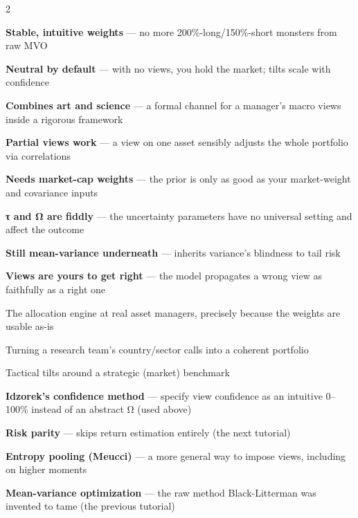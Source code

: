 \documentclass{pyportfolios-note}
\begin{document}
\begin{multicols}{2}
\begin{notebullets}
\item \textbf{Stable, intuitive weights} — no more 200\%-long/150\%-short
      monsters from raw MVO
\item \textbf{Neutral by default} — with no views, you hold the market; tilts
      scale with confidence
\item \textbf{Combines art and science} — a formal channel for a manager's macro
      views inside a rigorous framework
\item \textbf{Partial views work} — a view on one asset sensibly adjusts the
      whole portfolio via correlations
\end{notebullets}

\begin{notebullets}
\item \textbf{Needs market-cap weights} — the prior is only as good as your
      market-weight and covariance inputs
\item \textbf{τ and Ω are fiddly} — the uncertainty parameters have no universal
      setting and affect the outcome
\item \textbf{Still mean-variance underneath} — inherits variance's blindness to
      tail risk
\item \textbf{Views are yours to get right} — the model propagates a wrong view
      as faithfully as a right one
\end{notebullets}

\begin{notebullets}
\item The allocation engine at real asset managers, precisely because the
      weights are usable as-is
\item Turning a research team's country/sector calls into a coherent portfolio
\item Tactical tilts around a strategic (market) benchmark
\end{notebullets}

\begin{notebullets}
\item \textbf{Idzorek's confidence method} — specify view confidence as an
      intuitive 0–100\% instead of an abstract Ω (used above)
\item \textbf{Risk parity} — skips return estimation entirely (the next tutorial)
\item \textbf{Entropy pooling (Meucci)} — a more general way to impose views,
      including on higher moments
\item \textbf{Mean-variance optimization} — the raw method Black-Litterman was
      invented to tame (the previous tutorial)
\end{notebullets}
\end{multicols}
\end{document}
